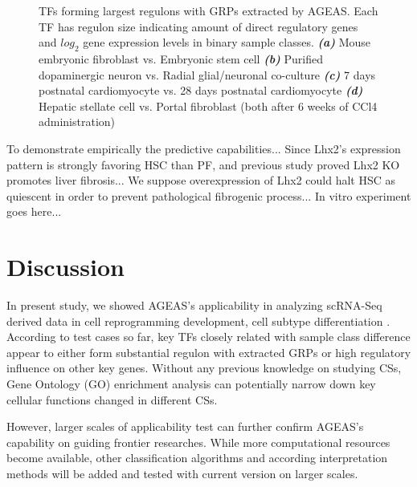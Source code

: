 \documentclass[fleqn,10pt]{wlscirep}
\begin{document}
\begin{figure}
    \caption{
      TFs forming largest regulons with GRPs extracted by AGEAS.
      Each TF has regulon size indicating amount of direct regulatory genes and $log_2$ gene expression levels in binary sample classes.
      \textbf{\emph{(a)}} Mouse embryonic fibroblast vs. Embryonic stem cell
      \textbf{\emph{(b)}} Purified dopaminergic neuron vs. Radial glial/neuronal co-culture
      \textbf{\emph{(c)}} 7 days postnatal cardiomyocyte vs. 28 days postnatal cardiomyocyte
      \textbf{\emph{(d)}} Hepatic stellate cell vs. Portal fibroblast (both after 6 weeks of CCl4 administration)
    }
    \label{result_figs}
  \end{figure}

  To demonstrate empirically the predictive capabilities...
  Since Lhx2's expression pattern is strongly favoring HSC than PF, and previous study proved Lhx2 KO promotes liver fibrosis\cite{lhx2_fibro}...
  We suppose overexpression of Lhx2 could halt HSC as quiescent in order to prevent pathological fibrogenic process...
  In vitro experiment goes here...


\section*{Discussion}
  \label{disc}

  In present study, we showed AGEAS's applicability in analyzing scRNA-Seq derived data in cell reprogramming development, cell subtype differentiation .
  According to test cases so far, key TFs closely related with sample class difference appear to either form substantial regulon with extracted GRPs or high regulatory influence on other key genes.
  Without any previous knowledge on studying CSs, Gene Ontology (GO) enrichment analysis can potentially narrow down key cellular functions changed in different CSs.

  However, larger scales of applicability test can further confirm AGEAS's capability on guiding frontier researches.
  While more computational resources become available, other classification algorithms and according interpretation methods will be added and tested with current version on larger scales.
\end{document}
